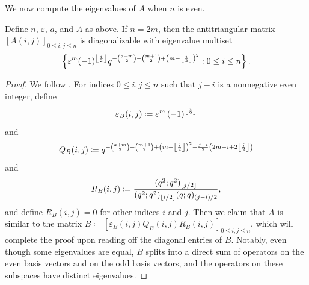 We now compute the eigenvalues of $A$ when $n$ is even.
\begin{proposition} \label{prop:helper-matrix-even}
    Define $n$, $\varepsilon$, $a$, and $A$ as above. If $n=2m$, then the antitriangular matrix $[A(i,j)]_{0\le i,j\le n}$ is diagonalizable with eigenvalue multiset
    \[\left\{\varepsilon^{m}(-1)^{\left\lfloor{\frac i2}\right\rfloor}q^{-\binom{a+m}2-\binom{m+1}2+\left(m-\left\lfloor{\frac i2}\right\rfloor\right)^2}:0\le i\le n\right\}.\]
\end{proposition}
\begin{proof}
    We follow . For indices $0\le i,j\le n$ such that $j-i$ is a nonnegative even integer, define
    \[\varepsilon_B(i,j)\coloneqq\varepsilon^{m}\left(-1\right)^{\left\lfloor{\frac{i}{2}}\right\rfloor}\]
    and
    \[Q_B(i,j)\coloneqq q^{-\binom{a+m}2-\binom{m+1}2+\left(m-\left\lfloor{\frac{i}{2}}\right\rfloor\right)^{2}-\frac{j-i}{2}\left(2m-i+2\left\lfloor{\frac{i}{2}}\right\rfloor\right)}\]
    and
    \[R_B(i,j)\coloneqq\frac{(q^2;q^2)_{\left\lfloor{j/2}\right\rfloor}}{(q^2;q^2)_{\left\lfloor{i/2}\right\rfloor}(q;q)_{(j-i)/2}},\]
    and define $R_B(i,j)=0$ for other indices $i$ and $j$. Then we claim that $A$ is similar to the matrix $B\coloneqq[\varepsilon_B(i,j)Q_B(i,j)R_B(i,j)]_{0\le i,j\le n}$, which will complete the proof upon reading off the diagonal entries of $B$. Notably, even though some eigenvalues are equal, $B$ splits into a direct sum of operators on the even basis vectors and on the odd basis vectors, and the operators on these subspaces have distinct eigenvalues.


\end{proof}

